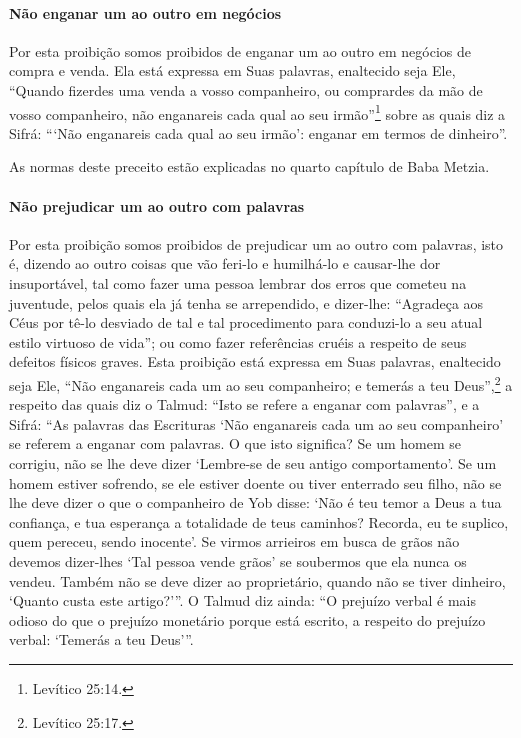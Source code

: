 \paragraph{Não enganar um ao outro em negócios}

Por esta proibição somos proibidos de enganar um ao outro em negócios
de compra e venda. Ela está expressa em Suas palavras, enaltecido seja
Ele, ``Quando fizerdes uma venda a vosso companheiro, ou comprardes da
mão de vosso companheiro, não enganareis cada qual ao seu irmão''\footnote{Levítico
25:14.} sobre as quais diz a Sifrá: ```Não enganareis cada qual ao seu
irmão': enganar em termos de dinheiro''.

As normas deste preceito estão explicadas no quarto capítulo de Baba Metzia.

\paragraph{Não prejudicar um ao outro com palavras}

Por esta proibição somos proibidos de prejudicar um ao outro com
palavras, isto é, dizendo ao outro coisas que vão feri-lo e humilhá-lo e
causar-lhe dor insuportável, tal como fazer uma pessoa lembrar dos erros
que cometeu na juventude, pelos quais ela já tenha se arrependido, e
dizer-lhe: ``Agradeça aos Céus por tê-lo desviado de tal e tal
procedimento para conduzi-lo a seu atual estilo virtuoso de vida''; ou
como fazer referências cruéis a respeito de seus defeitos físicos
graves. Esta proibição está expressa em Suas palavras, enaltecido seja
Ele, ``Não enganareis cada um ao seu companheiro; e temerás a teu Deus'',\footnote{Levítico 25:17.} a respeito das quais diz o Talmud: ``Isto se refere a
enganar com palavras'', e a Sifrá: ``As palavras das Escrituras `Não
enganareis cada um ao seu companheiro' se referem a enganar com
palavras. O que isto significa? Se um homem se corrigiu, não se lhe
deve dizer `Lembre-se de seu antigo comportamento'. Se um homem estiver
sofrendo, se ele estiver doente ou tiver enterrado seu filho, não se
lhe deve dizer o que o companheiro de Yob disse: `Não é teu temor a Deus
a tua confiança, e tua esperança a totalidade de teus caminhos? Recorda,
eu te suplico, quem pereceu, sendo inocente'. Se virmos arrieiros em
busca de grãos não devemos dizer-lhes `Tal pessoa vende grãos' se
soubermos que ela nunca os vendeu. Também não se deve dizer ao
proprietário, quando não se tiver dinheiro, `Quanto custa este
artigo?'''. O Talmud diz ainda: ``O prejuízo verbal é mais odioso do que
o prejuízo monetário porque está escrito, a respeito do prejuízo
verbal: `Temerás a teu Deus'''.

